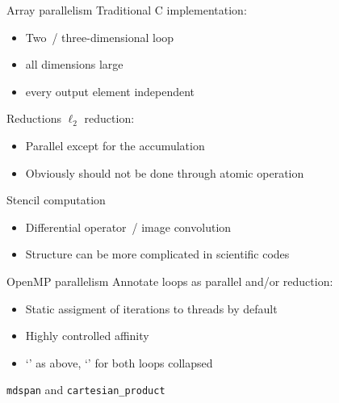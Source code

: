 \documentclass[10pt]{beamer}
\begin{document}
\begin{frame}[containsverbatim]{Array parallelism}
  Traditional C implementation:
  
  \begin{itemize}
  \item Two~/ three-dimensional loop
  \item all dimensions large
  \item every output element independent
  \end{itemize}
\end{frame}

\begin{frame}[containsverbatim]{Reductions}
  $\ell_2$ reduction:%
  \begin{itemize}
  \item Parallel except for the accumulation
  \item Obviously should not be done through atomic operation
  \end{itemize}
\end{frame}

\begin{frame}[containsverbatim]{Stencil computation}
  \begin{itemize}
  \item Differential operator~/ image convolution
  \item Structure can be more complicated in scientific codes
  \end{itemize}
\end{frame}

\begin{frame}[containsverbatim]{OpenMP parallelism}
  Annotate loops as parallel and/or reduction:
  \begin{itemize}
  \item Static assigment of iterations to threads by default
  \item Highly controlled affinity
  \item `' as above, `' for both loops collapsed
  \end{itemize}
\end{frame}

\begin{frame}[containsverbatim]{\texttt{mdspan} and \texttt{cartesian\_product}}
  \hbox\bgroup
  \egroup

\end{frame}
\end{document}
